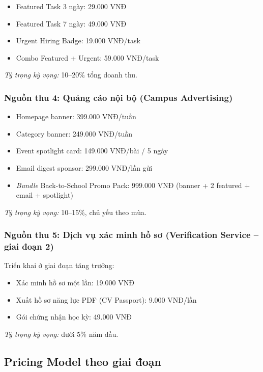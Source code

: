 \begin{itemize}
  \item Featured Task 3 ngày: 29.000 VNĐ
  \item Featured Task 7 ngày: 49.000 VNĐ
  \item Urgent Hiring Badge: 19.000 VNĐ/task
  \item Combo Featured + Urgent: 59.000 VNĐ/task
\end{itemize}

\textit{Tỷ trọng kỳ vọng:} 10--20\% tổng doanh thu.

\subsubsection{Nguồn thu 4: Quảng cáo nội bộ (Campus Advertising)}

\begin{itemize}
  \item Homepage banner: 399.000 VNĐ/tuần
  \item Category banner: 249.000 VNĐ/tuần
  \item Event spotlight card: 149.000 VNĐ/bài / 5 ngày
  \item Email digest sponsor: 299.000 VNĐ/lần gửi
  \item \textit{Bundle} Back-to-School Promo Pack: 999.000 VNĐ (banner + 2 featured + email + spotlight)
\end{itemize}

\textit{Tỷ trọng kỳ vọng:} 10--15\%, chủ yếu theo mùa.

\subsubsection{Nguồn thu 5: Dịch vụ xác minh hồ sơ (Verification Service -- giai đoạn 2)}

Triển khai ở giai đoạn tăng trưởng:
\begin{itemize}
  \item Xác minh hồ sơ một lần: 19.000 VNĐ
  \item Xuất hồ sơ năng lực PDF (CV Passport): 9.000 VNĐ/lần
  \item Gói chứng nhận học kỳ: 49.000 VNĐ
\end{itemize}
\textit{Tỷ trọng kỳ vọng:} dưới 5\% năm đầu.

\subsection{Pricing Model theo giai đoạn}

